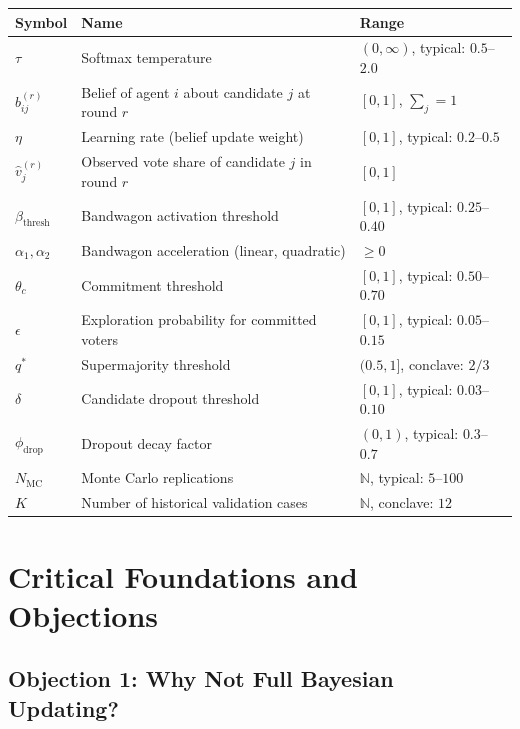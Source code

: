 \begin{table}[htbp]
\centering
\renewcommand{\arraystretch}{1.2}
\small
\begin{tabular}{@{}lll@{}}
\toprule
\textbf{Symbol} & \textbf{Name} & \textbf{Range} \\
\midrule
$\tau$ & Softmax temperature & $(0, \infty)$, typical: $0.5$--$2.0$ \\
$b_{ij}^{(r)}$ & Belief of agent $i$ about candidate $j$ at round $r$ & $[0,1]$, $\sum_j = 1$ \\
$\eta$ & Learning rate (belief update weight) & $[0,1]$, typical: $0.2$--$0.5$ \\
$\hat{v}_j^{(r)}$ & Observed vote share of candidate $j$ in round $r$ & $[0,1]$ \\
$\beta_{\text{thresh}}$ & Bandwagon activation threshold & $[0,1]$, typical: $0.25$--$0.40$ \\
$\alpha_1, \alpha_2$ & Bandwagon acceleration (linear, quadratic) & $\geq 0$ \\
$\theta_c$ & Commitment threshold & $[0,1]$, typical: $0.50$--$0.70$ \\
$\epsilon$ & Exploration probability for committed voters & $[0,1]$, typical: $0.05$--$0.15$ \\
$q^*$ & Supermajority threshold & $(0.5, 1]$, conclave: $2/3$ \\
$\delta$ & Candidate dropout threshold & $[0,1]$, typical: $0.03$--$0.10$ \\
$\phi_{\text{drop}}$ & Dropout decay factor & $(0,1)$, typical: $0.3$--$0.7$ \\
$N_{\text{MC}}$ & Monte Carlo replications & $\mathbb{N}$, typical: $5$--$100$ \\
$K$ & Number of historical validation cases & $\mathbb{N}$, conclave: $12$ \\
\bottomrule
\end{tabular}
\end{table}


\section{Critical Foundations and Objections}
\label{sec:bp-foundations}

\subsection{Objection 1: Why Not Full Bayesian Updating?}

